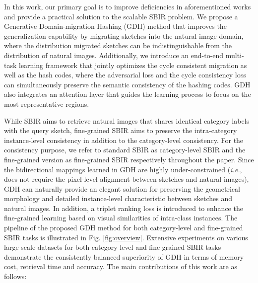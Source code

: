 \documentclass[runningheads]{llncs}
\begin{document}
In this work, our primary goal is to improve deficiencies in aforementioned works and provide a practical solution to the scalable SBIR problem. We propose a Generative Domain-migration Hashing (GDH) method that improves the generalization capability by migrating sketches into the natural image domain, where the distribution migrated sketches can be indistinguishable from the distribution of natural images. Additionally, we introduce an end-to-end multi-task learning framework that jointly optimizes the cycle consistent migration as well as the hash codes, where the adversarial loss and the cycle consistency loss can simultaneously preserve 
the semantic consistency of the hashing codes. GDH also integrates an attention layer that guides the learning process to focus on the most representative regions.

While SBIR aims to retrieve natural images that shares identical category labels with the query sketch, fine-grained SBIR aims to preserve the intra-category instance-level consistency in addition to the category-level consistency. For the consistency purpose, we refer to standard SBIR as category-level SBIR and the fine-grained version as fine-grained SBIR respectively throughout the paper. Since the bidirectional mappings learned in GDH are highly under-constrained (\emph{i.e.}, does not require the pixel-level alignment \cite{IsolaZZE17} between sketches and natural images), GDH can naturally provide an elegant solution for preserving the geometrical morphology and detailed instance-level characteristic between sketches and natural images. In addition, a triplet ranking loss is introduced to enhance the fine-grained learning based on visual similarities of intra-class instances. The pipeline of the proposed GDH method for both category-level and fine-grained SBIR tasks is illustrated in Fig. \ref{fig:overview}. Extensive experiments on various large-scale datasets for both category-level and fine-grained SBIR tasks demonstrate the consistently balanced superiority of GDH in terms of memory cost, retrieval time and accuracy. The main contributions of this work are as follows:
\end{document}
